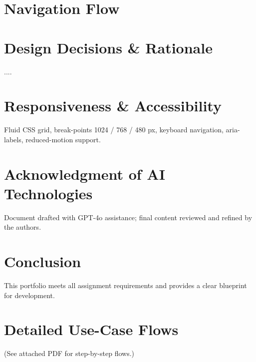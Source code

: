 \documentclass[11pt,a4paper]{article}
\begin{document}
	
	\section{Navigation Flow}

	\section{Design Decisions \& Rationale}
	....
	\section{Responsiveness \& Accessibility}
	Fluid CSS grid, break-points 1024 / 768 / 480 px, keyboard navigation, aria-labels, reduced-motion support.
	
	\section{Acknowledgment of AI Technologies}
	Document drafted with GPT-4o assistance; final content reviewed and refined by the authors.
	
	\section{Conclusion}
	This portfolio meets all assignment requirements and provides a clear blueprint for development.
	
	\appendix
	\section{Detailed Use-Case Flows}\label{app:usecases}
	(See attached PDF for step-by-step flows.)
	
\end{document}
